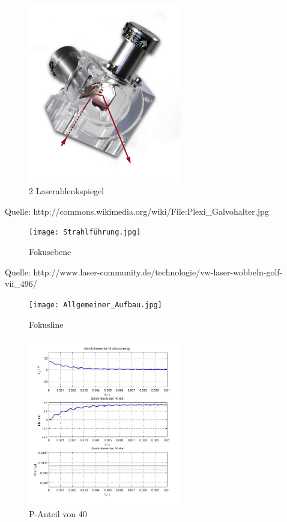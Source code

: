 \newpage


{\small \listoffigures}
\label{Abbildungsverzeichnis}

\begin{figure}[ht]
	\centering
	\includegraphics[width=0.6\textwidth]{Plexi_Galvohalter.jpg}
	\caption{2 Laserablenkspiegel\cite{wiki}}
	\label{galvohalter}
\end{figure}
Quelle: http://commons.wikimedia.org/wiki/File:Plexi_Galvohalter.jpg


\begin{figure}[ht]
	\centering
	\texttt{[image: Strahlführung.jpg]}
	\caption{Fokusebene\cite{lasercommunity}}
	\label{fokusebene}
\end{figure}
Quelle: http://www.laser-community.de/technologie/vw-laser-wobbeln-golf-vii_496/


\begin{figure}[ht]
	\centering
	\texttt{[image: Allgemeiner\_Aufbau.jpg]}
	\caption{Fokusline\cite{selbstgemalt}}
	\label{fokuslinie}
\end{figure}


\begin{figure}[ht]
	\centering
	\includegraphics[width=0.6\textwidth]{NurP40.jpg}
	\caption{P-Anteil von 40}
	\label{p40}
\end{figure}


